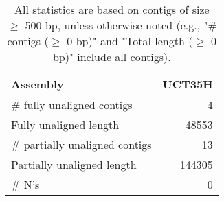 \documentclass[12pt,a4paper]{article}
\begin{document}
\begin{table}[ht]
\begin{center}
\caption{All statistics are based on contigs of size $\geq$ 500 bp, unless otherwise noted (e.g., "\# contigs ($\geq$ 0 bp)" and "Total length ($\geq$ 0 bp)" include all contigs).}
\begin{tabular}{|l*{1}{|r}|}
\hline
Assembly & UCT35H \\ \hline
\# fully unaligned contigs & 4 \\ \hline
Fully unaligned length & 48553 \\ \hline
\# partially unaligned contigs & 13 \\ \hline
Partially unaligned length & 144305 \\ \hline
\# N's & 0 \\ \hline
\end{tabular}
\end{center}
\end{table}
\end{document}

